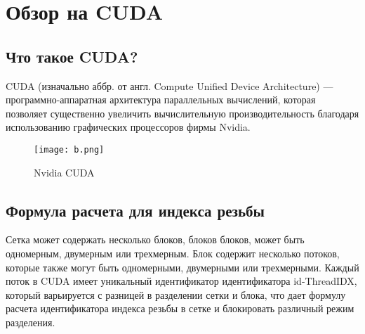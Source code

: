\documentclass[a4paper, 12pt]{report}
\begin{document}

    \chapter{Обзор на CUDA}
    \section{Что такое CUDA?}
	
    CUDA (изначально аббр. от англ. Compute Unified Device Architecture) — программно-аппаратная архитектура параллельных вычислений, которая позволяет существенно увеличить вычислительную производительность благодаря использованию графических процессоров фирмы Nvidia.
    \begin{figure}[h!]
	\centering
	\texttt{[image: b.png]}
	\caption{Nvidia CUDA}
	\label{}
    \end{figure}
    \section{Формула расчета для индекса резьбы}
    Сетка может содержать несколько блоков, блоков блоков, может быть одномерным, двумерным или трехмерным. Блок содержит несколько потоков, которые также могут быть одномерными, двумерными или трехмерными.
    Каждый поток в CUDA имеет уникальный идентификатор идентификатора id-ThreadIDX, который варьируется с разницей в разделении сетки и блока, что дает формулу расчета идентификатора индекса резьбы в сетке и блокировать различный режим разделения.
    
\end{document}
